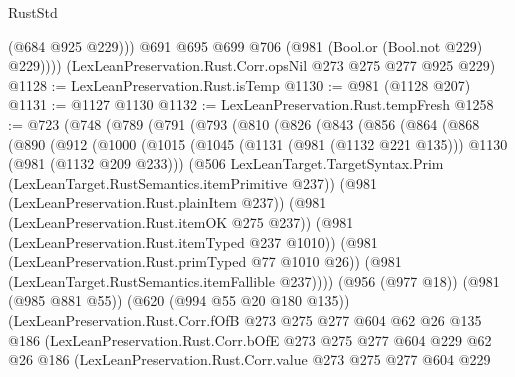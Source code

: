 \begin{lexlean}{RustStd}
\begin{coremodule}
            (@684 @925 @229)))
        @691
        @695
        @699
        @706
        (@981 (Bool.or (Bool.not @229) @229))))
    (LexLeanPreservation.Rust.Corr.opsNil @273 @275 @277 @925 @229)
@1128 := LexLeanPreservation.Rust.isTemp
@1130 := @981 (@1128 @207)
@1131 := @1127 @1130
@1132 := LexLeanPreservation.Rust.tempFresh
@1258 := @723
    (@748
      (@789
        (@791
          (@793
            (@810
              (@826
                (@843
                  (@856
                    (@864
                      (@868
                        (@890
                          (@912
                            (@1000
                              (@1015
                                (@1045
                                  (@1131 (@981 (@1132 @221 @135)))
                                  @1130
                                  (@981 (@1132 @209 @233)))
                                (@506
                                  LexLeanTarget.TargetSyntax.Prim
                                  (LexLeanTarget.RustSemantics.itemPrimitive @237))
                                (@981 (LexLeanPreservation.Rust.plainItem @237))
                                (@981 (LexLeanPreservation.Rust.itemOK @275 @237))
                                (@981 (LexLeanPreservation.Rust.itemTyped @237 @1010))
                                (@981 (LexLeanPreservation.Rust.primTyped @77 @1010 @26))
                                (@981 (LexLeanTarget.RustSemantics.itemFallible @237))))
                            (@956 (@977 @18))
                            (@981 (@985 @881 @55))
                            (@620 (@994 @55 @20 @180 @135))
                            (LexLeanPreservation.Rust.Corr.fOfB
                              @273
                              @275
                              @277
                              @604
                              @62
                              @26
                              @135
                              @186
                              (LexLeanPreservation.Rust.Corr.bOfE
                                @273
                                @275
                                @277
                                @604
                                @229
                                @62
                                @26
                                @186
                                (LexLeanPreservation.Rust.Corr.value
                                  @273
                                  @275
                                  @277
                                  @604
                                  @229

\end{coremodule}
\end{lexlean}
